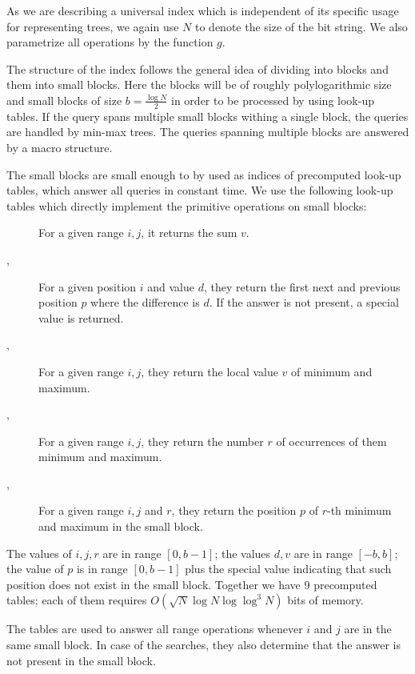 As we are describing a universal index which is independent of its specific usage for representing trees, we again use $N$ to denote the size of the bit string.
We also parametrize all operations by the function $g$.

The structure of the index follows the general idea of dividing into blocks and them into small blocks.
Here the blocks will be of roughly polylogarithmic size and small blocks of size $b = \frac{\log N}{2}$ in order to be processed by using look-up tables.
If the query spans multiple small blocks withing a single block, the queries are handled by min-max trees.
The queries spanning multiple blocks are answered by a macro structure.

\bigbreak

The small blocks are small enough to by used as indices of precomputed look-up tables, which answer all queries in constant time.
We use the following look-up tables which directly implement the primitive operations on small blocks:
\begin{description}
	\item[\summ{}]
	For a given range $i, j$, it returns the sum $v$.
	
	\item[\fwdSearch{}, \bwdSearch{}]
	For a given position $i$ and value $d$, they return the first next and previous position $p$ where the difference is $d$.
	If the answer is not present, a special value is returned.
	
	\item[\rmq{}, \RMQ{}]
	For a given range $i, j$, they return the local value $v$ of minimum and maximum.
	
	\item[\rmqSize{}, \RMQSize{}]
	For a given range $i, j$, they return the number $r$ of occurrences of them minimum and maximum.
	
	\item[\rmqSelect{}, \RMQSelect{}]
	For a given range $i, j$ and $r$, they return the position $p$ of $r$-th minimum and maximum in the small block.	
\end{description}

The values of $i, j, r$ are in range $[0, b - 1]$; the values $d, v$ are in range $[-b, b]$; the value of $p$ is in range $[0, b - 1]$ plus the special value indicating that such position does not exist in the small block.
Together we have 9 precomputed tables; each of them requires $O(\sqrt{N} \log N \log \log^3 N)$ bits of memory.

The tables are used to answer all range operations whenever $i$ and $j$ are in the same small block.
In case of the searches, they also determine that the answer is not present in the small block.

